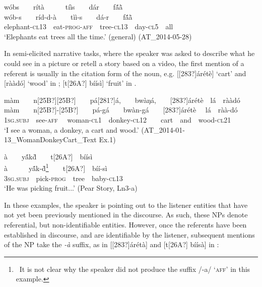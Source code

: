 \documentclass[output=paper]{langsci/langscibook}
\begin{document}
\ea\label{ex:teo:27}
\label{bkm:Ref445382480}w\'{o}bs\ \ \ \ rítà\ \ \ \ \ \ t\'{i}\`{i}s\ \ \ \ d\'{a}r\ \ \ \ f\'{ã}\`{ã}\\
\gll w\'{o}b\nobreakdash-s\ \ \ \ ríd-d-à\ \ \ \ t\`{i}\`{i}\nobreakdash-s\ \ \ \ d\'{a}\nobreakdash-r\ \ \ \ f\'{ã}\`{ã}\\
elephant\nobreakdash-\textsc{cl13\ \ }eat\nobreakdash-\textsc{prog-aff}\ \ tree\nobreakdash-\textsc{cl13\ \ }day-\textsc{cl5}\ \ all\\
\glt ‘Elephants eat trees all the time.’ (general) (AT\_2014-05-28)
\z

In semi-elicited narrative tasks, where the speaker was asked to describe what he could see in a picture or retell a story based on a video, the first mention of a referent is usually in the citation form of the noun, e.g. [[283?]\'{a}r\'{e}t\`{e}] ‘cart’ and [r\`{a}\`{a}d\'{o}] ‘wood’ in ; [t[26A?] b\'{i}\'{i}s\`{i}] ‘fruit’\textit{ }in .

\ea\label{ex:teo:28}
\label{bkm:Ref432711727}m\`{a}m\ \ \ \ n[25B?][25B?]\ \ \ \ p\'{a}[281?]\'{a},\ \ \ \ bw\`{a}ŋ\'{a},\ \ \ \ [283?]\'{a}r\'{e}t\`{e}\ \ l\'{a}\ \ r\`{a}\`{a}d\'{o}\\
\gll m\`{a}m\ \ \ \ n[25B?]-[25B?]\ \ \ \ p\'{a}-g\'{a}\ \ \ \ bw\`{a}n-g\'{a}\ \ \ \ [283?]\'{a}r\'{e}t\`{e} \ \ l\'{a}\ \ r\`{a}\`{a}-d\'{o}\\
1\textsc{sg.subj}\ \ see-\textsc{aff} \ \ woman\nobreakdash-\textsc{cl1\ \ }donkey\nobreakdash-\textsc{cl12\ \ \ \ }cart\ \ and\ \ wood-\textsc{cl21}\\
\glt ‘I see a woman, a donkey, a cart and wood.’ (AT\_2014-01-13\_WomanDonkeyCart\_Text Ex.1)\label{bkm:Ref432711763}
\z

\ea\label{ex:teo:29}
à\ \ \ \ y\'{ã}k\`{d}\ \ \ \ t[26A?]\ \ b\'{i}\'{i}s\`{i}\\
\gll à\ \ \ \ \ \ y\'{ã}k\nobreakdash-\`{d}\footnote{\ It is not clear why the speaker did not produce the suffix /-a/ ‘\textsc{aff}’ in this example.}\ \ \ \ t[26A?]\ \ b\'{i}\'{i}\nobreakdash-s\`{i}\\
3\textsc{sg.subj}\ \ pick-\textsc{prog}\ \ tree\ \ baby\nobreakdash-\textsc{cl13}\\
\glt ‘He was picking fruit...’ (Pear Story, Ln3-a)
\z

In these examples, the speaker is pointing out to the listener entities that have not yet been previously mentioned in the discourse. As such, these NPs denote referential, but non-identifiable entities. However, once the referents have been established in discourse, and are identifiable by the listener, subsequent mentions of the NP take the \textit{{}-\`{a}} suffix, as in [[283?]árétà]  and [t[26A?] bíísà] in :
\end{document}
